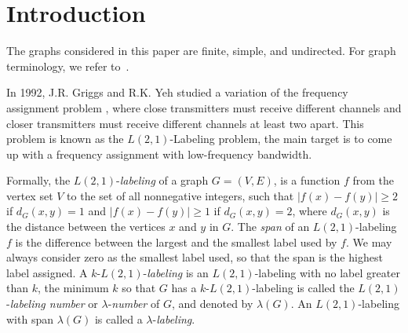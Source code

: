 \documentclass{article}
\newtheorem{open problem} {Open Problem}
\numberwithin{lemma}{section}
\numberwithin{theorem}{section}
\numberwithin{cor}{section}
\numberwithin{prop}{section}
\numberwithin{con}{section}
\numberwithin{claim}{section}
\numberwithin{obs}{section}
\numberwithin{dnt}{section}
\begin{document}
\section{Introduction}
\par The graphs considered in this paper are finite, simple, and undirected. For graph terminology, we refer to~\cite{dougla}.
\par In 1992, J.R. Griggs and R.K. Yeh \cite{griggs} studied a variation of the frequency assignment problem \cite{hale}, where close transmitters must receive different channels and closer transmitters must receive different channels at least two apart. This problem is known as the $L(2,1)$-Labeling problem, the main target is to come up with a frequency assignment with low-frequency bandwidth.
\par Formally, the $L(2, 1)$-\textit{labeling} of a graph $G=(V,E)$, is a function $f$ from the vertex set $V$ to the set of all nonnegative integers, such that $|f(x)-f(y)|\geq 2$ if $d_G(x, y)=1$ and $|f(x)-f(y)|\geq 1$ if $d_G(x, y)=2$, where $d_G(x, y)$ is the distance between the vertices $x$ and $y$ in $G$. The \textit{span} of an $L(2,1)$-labeling  $f$ is the difference between the largest and the smallest label used by $f$. We may always consider zero as the smallest label used, so that the span is the highest label assigned. A $k$-$L(2,1)$-\textit{labeling} is an $L(2, 1)$-labeling with no label greater than $k$, the minimum $k$ so that $G$ has a $k$-$L(2, 1)$-labeling is called the $L(2,1)$-\textit{labeling number} or $\lambda$-\textit{number} of $G$, and denoted by  $\lambda(G)$. An $L(2, 1)$-labeling with span $\lambda(G)$ is called a $\lambda$-\textit{labeling}. 
\end{document}
